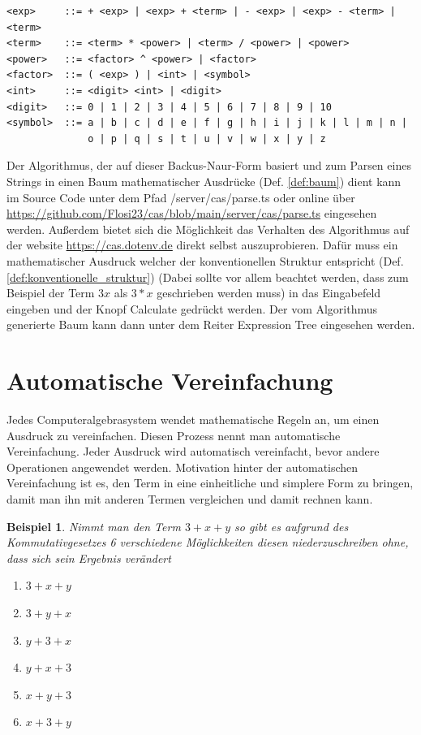 \documentclass[11pt]{article}
\newcommand{\lab}[1]{(Def. \ref{#1})}
\newtheorem{example}{Beispiel}
\begin{document}
\begin{verbatim}
<exp>     ::= + <exp> | <exp> + <term> | - <exp> | <exp> - <term> | <term> 
<term>    ::= <term> * <power> | <term> / <power> | <power>
<power>   ::= <factor> ^ <power> | <factor>
<factor>  ::= ( <exp> ) | <int> | <symbol> 
<int>     ::= <digit> <int> | <digit>
<digit>   ::= 0 | 1 | 2 | 3 | 4 | 5 | 6 | 7 | 8 | 9 | 10
<symbol>  ::= a | b | c | d | e | f | g | h | i | j | k | l | m | n | 
              o | p | q | s | t | u | v | w | x | y | z
\end{verbatim}

Der Algorithmus, der auf dieser Backus-Naur-Form basiert und zum Parsen eines Strings in einen
Baum mathematischer Ausdrücke \lab{def:baum} dient kann im Source Code unter dem Pfad /server/cas/parse.ts 
oder online über \url{https://github.com/Flosi23/cas/blob/main/server/cas/parse.ts} eingesehen werden. \newline
Außerdem bietet sich die Möglichkeit das Verhalten des Algorithmus auf der website  \url{https://cas.dotenv.de}
direkt selbst auszuprobieren. Dafür muss ein mathematischer Ausdruck welcher der konventionellen Struktur 
entspricht \lab{def:konventionelle_struktur}
(Dabei sollte vor allem beachtet werden, dass zum Beispiel der Term $3x$ als $3*x$ geschrieben werden muss)
in das Eingabefeld eingeben und der Knopf \glqq Calculate\grqq{}  gedrückt werden. 
Der vom Algorithmus generierte Baum kann dann unter dem Reiter \grqq Expression Tree\grqq{} eingesehen werden.

\section{Automatische Vereinfachung}

Jedes Computeralgebrasystem wendet mathematische Regeln an, um einen Ausdruck zu vereinfachen. 
Diesen Prozess nennt man automatische Vereinfachung. 
Jeder Ausdruck wird automatisch vereinfacht, bevor andere Operationen angewendet werden. 
Motivation hinter der automatischen Vereinfachung ist es, den Term in eine einheitliche und simplere Form zu bringen, 
damit man ihn mit anderen Termen vergleichen und damit rechnen kann. 

\begin{example}
Nimmt man den Term $3+x+y$ so gibt es aufgrund des Kommutativgesetzes 6 verschiedene Möglichkeiten diesen
niederzuschreiben ohne, dass sich sein Ergebnis verändert
\begin{enumerate}
  \item $3+x+y$
  \item $3+y+x$
  \item $y+3+x$
  \item $y+x+3$
  \item $x+y+3$
  \item $x+3+y$
\end{enumerate}
\end{example}
\end{document}
